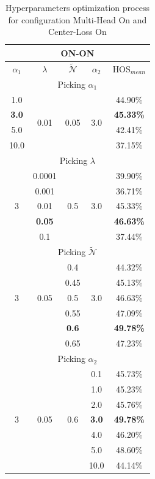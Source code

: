 \documentclass[10pt,twocolumn,letterpaper]{article}
\begin{document}
\begin{table}[h!]
  \centering
  \begin{tabular}[h]{||c|c|c|c||c||}
    \hline
    \multicolumn{5}{||c||}{ON-ON} \\
    \hline
    $\alpha_1$ & $\lambda$ & $\mathcal{\tilde N}$ & $\alpha_2$ & HOS$_{mean}$ \\
    \hline
    \hline
    \multicolumn{5}{||c||}{Picking $\alpha_1$} \\
    \hline
    1.0 & \multirow{4}{*}{0.01} & \multirow{4}{*}{0.05} & \multirow{4}{*}{3.0} & 44.90\% \\
    {\bf 3.0} & && & {\bf 45.33\%} \\
    5.0 & && & 42.41\% \\
    10.0 & && & 37.15\% \\
    \hline
    \hline
    \multicolumn{5}{||c||}{Picking $\lambda$} \\
    \hline
    \multirow{5}{*}{3} & 0.0001 & \multirow{5}{*}{0.5} & \multirow{5}{*}{3.0} & 39.90\% \\
    & 0.001 & & & 36.71\% \\
    & 0.01 & & & 45.33\% \\
    & {\bf 0.05 }& & & {\bf 46.63\%} \\
    & 0.1 & & & 37.44\% \\
    \hline
    \hline
    \multicolumn{5}{||c||}{Picking $\mathcal{\tilde N}$} \\
    \hline
    \multirow{5}{*}{3} & \multirow{5}{*}{0.05} & 0.4 & \multirow{5}{*}{3.0} & 44.32\% \\
    & & 0.45 & & 45.13\% \\
    & & 0.5 & & 46.63\% \\
    & & 0.55 & & 47.09\% \\
    & & {\bf 0.6} & & {\bf 49.78\%} \\
    & & 0.65 & & 47.23\% \\
    \hline
    \hline
    \multicolumn{5}{||c||}{Picking $\alpha_2$} \\
    \hline
    \multirow{7}{*}{3} & \multirow{7}{*}{0.05} & \multirow{7}{*}{0.6} & 0.1 & 45.73\% \\
    & & & 1.0 & 45.23\% \\
    & & & 2.0 & 45.76\% \\
    & & & {\bf 3.0} & {\bf 49.78\%} \\
    & & & 4.0 & 46.20\% \\
    & & & 5.0 & 48.60\% \\
    & & & 10.0 & 44.14\% \\
    \hline
  \end{tabular}
  \caption{\centering\label{tab:ablationonon} Hyperparameters optimization process for configuration Multi-Head On and Center-Loss On}
\end{table}
\end{document}
